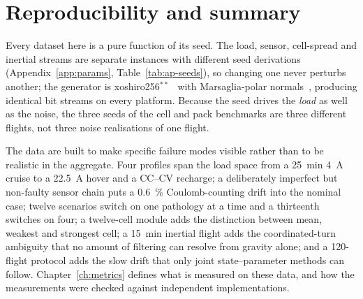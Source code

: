 \section{Reproducibility and summary}

Every dataset here is a pure function of its seed. The load, sensor, cell-spread and inertial
streams are separate  instances with different seed derivations
(Appendix~\ref{app:params}, Table~\ref{tab:ap-seeds}), so changing one never perturbs another; the
generator is xoshiro256$^{**}$~\cite{blackman2021xoshiro} with Marsaglia-polar
normals~\cite{marsaglia1964polar}, producing identical bit streams on every platform. Because the
seed drives the \emph{load} as well as the noise, the three seeds of the cell and pack benchmarks
are three different flights, not three noise realisations of one flight.

The data are built to make specific failure modes visible rather than to be realistic in the
aggregate. Four profiles span the load space from a \SI{25}{\minute} \SI{4}{\ampere} cruise to a
\SI{22.5}{\ampere} hover and a CC--CV recharge; a deliberately imperfect but non-faulty sensor chain
puts a \SI{0.6}{\percent} Coulomb-counting drift into the nominal case; twelve scenarios switch on
one pathology at a time and a thirteenth switches on four; a twelve-cell module adds the distinction
between mean, weakest and strongest cell; a \SI{15}{\minute} inertial flight adds the
coordinated-turn ambiguity that no amount of filtering can resolve from gravity alone; and a
120-flight protocol adds the slow drift that only joint state--parameter methods can follow.
Chapter~\ref{ch:metrics} defines what is measured on these data, and how the measurements were
checked against independent implementations.
